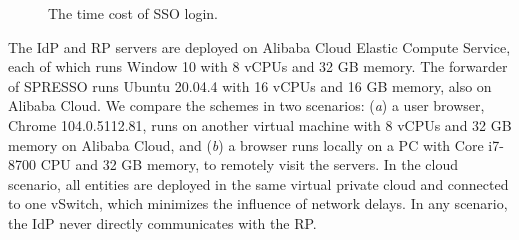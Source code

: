 \begin{figure}[tb]
  \centering
  \caption{The time cost of SSO login.}
  \label{fig:evaluation}
\end{figure}


The IdP and RP servers are deployed on Alibaba Cloud Elastic Compute Service,
      each of which runs Window 10 with 8 vCPUs and 32 GB memory.
The forwarder of SPRESSO runs Ubuntu 20.04.4 with 16 vCPUs and 16 GB memory,
    also on Alibaba Cloud.
We compare the schemes in two scenarios:
    (\emph{a}) a user browser, Chrome 104.0.5112.81, runs on another virtual machine with 8 vCPUs and 32 GB memory on Alibaba Cloud,
        and (\emph{b}) a browser runs locally on a PC with Core i7-8700 CPU and 32 GB memory, to remotely visit the servers.
In the cloud scenario, all entities are deployed in the same virtual private cloud and connected to one vSwitch,
    which minimizes the influence of network delays.
In any scenario, the IdP never directly communicates with the RP.

